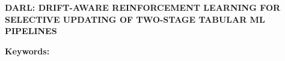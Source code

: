 
\begin{center}
    \large \vspace{-1.5cm} \textbf{\MakeUppercase{DARL: Drift-Aware Reinforcement Learning for Selective Updating of Two-Stage Tabular ML Pipelines}}
\end{center}


\noindent \textbf{Keywords:}\\
